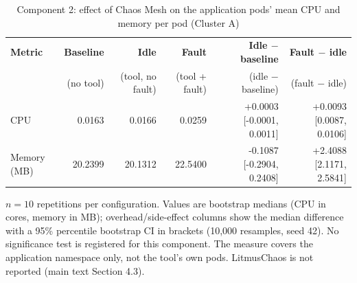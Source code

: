 \begin{table}[ht]
\centering
\caption{Component 2: effect of Chaos Mesh on the application pods' mean CPU and memory per pod (Cluster A)}
\label{tab:component2}
\small
\begin{tabular}{lrrrrr}
\hline
\textbf{Metric} & \textbf{Baseline} & \textbf{Idle} & \textbf{Fault} & \textbf{Idle $-$ baseline} & \textbf{Fault $-$ idle} \\
 & (no tool) & (tool, no fault) & (tool + fault) & (idle $-$ baseline) & (fault $-$ idle) \\
\hline
CPU & 0.0163 & 0.0166 & 0.0259 & +0.0003 [-0.0001, 0.0011] & +0.0093 [0.0087, 0.0106] \\
Memory (MB) & 20.2399 & 20.1312 & 22.5400 & -0.1087 [-0.2904, 0.2408] & +2.4088 [2.1171, 2.5841] \\
\hline
\end{tabular}
\vspace{2mm}
\raggedright\footnotesize $n=10$ repetitions per configuration. Values are bootstrap medians (CPU in cores, memory in MB); overhead/side-effect columns show the median difference with a 95\% percentile bootstrap CI in brackets (10{,}000 resamples, seed 42). No significance test is registered for this component. The measure covers the application namespace only, not the tool's own pods. LitmusChaos is not reported (main text Section 4.3).
\end{table}